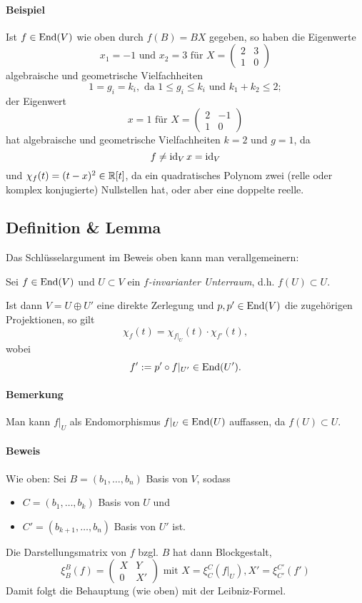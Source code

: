 \paragraph{Beispiel}
	Ist $ f\in\operatorname{End}(V) $ wie oben durch $ f(B)=BX $ gegeben, so haben die Eigenwerte
		\[ x_1 = -1 \text{ und } x_2 = 3 \text{ für }
		X=\begin{pmatrix} 2 &3\\1 & 0 \end{pmatrix} \]
	algebraische und geometrische Vielfachheiten 
		\[ 1 = g_i = k_i, \text{ da } 1\leq g_i \leq k_i \text{ und } k_1+k_2 \leq 2; \]
	der Eigenwert
		\[ x=1 \text{ für } X = \begin{pmatrix} 2&-1\\1&0 \end{pmatrix} \]
	hat algebraische und geometrische Vielfachheiten $ k = 2 \text{ und } g = 1 $, da
		\[ f\neq \operatorname{id}_V x = \operatorname{id}_V \]
	und $ \chi_f(t)=(t-x)^2 \in \mathbb{R}[t] $, da ein quadratisches Polynom zwei (relle oder komplex konjugierte) Nullstellen hat, oder aber eine doppelte reelle.

\subsection{Definition \& Lemma}
	Das Schlüsselargument im Beweis oben kann man verallgemeinern:\\
\begin{Definition}
	Sei $ f\in \operatorname{End}(V) $ und $ U\subset V $ ein \emph{$ f $-invarianter Unterraum}, d.h. $ f(U)\subset U $. 
\end{Definition}
\begin{Lemma}[]
	Ist dann $ V=U\oplus U' $ eine direkte Zerlegung und $ p,p'\in \operatorname{End}(V) $ die zugehörigen Projektionen, so gilt
		\[ \chi_f(t)=\chi_{f|_U}(t)\cdot \chi_{f'}(t), \]
	wobei
		\[ f':= p'\circ f|_{U'}\in \operatorname{End}(U'). \]
	\label{finvchar}
\end{Lemma}
\paragraph{Bemerkung}
	Man kann $ f|_U $ als Endomorphismus $ f|_U\in \operatorname{End}(U) $ auffassen, da $ f(U)\subset U $.
\paragraph{Beweis}
	Wie oben: Sei $ B=(b_1,\dots,b_n) $ Basis von $ V $, sodass
		\begin{itemize}
			\item $ C=(b_1,\dots,b_k) $ Basis von $ U $ und
			\item $ C'=(b_{k+1},\dots,b_n) $ Basis von $ U' $ ist.
		\end{itemize}
	Die Darstellungsmatrix von $ f $ bzgl. $ B $ hat dann Blockgestalt,
		\[ \xi_B^B(f) =
			\begin{pmatrix}
				X&Y\\0&X'
			\end{pmatrix}
		\text{ mit } X=\xi_C^C(f|_U), X' = \xi_{C'}^{C'}(f') \]
	Damit folgt die Behauptung (wie oben) mit der Leibniz-Formel.
